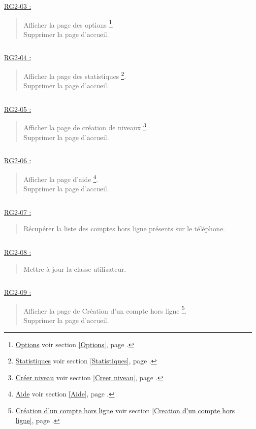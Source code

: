 \documentclass{report}
\begin{document}
		$\,$
		
		\underline{RG2-03 :}
			\begin{quote}
				Afficher la page des options%
					\footnote{
						\hyperlink{Options}{Options}
						\og voir section \ref{Options}, page \pageref{Options}.\fg
					}.\\
				Supprimer la page d'accueil\footnotemark[2].
			\end{quote}


		$\,$

		\underline{RG2-04 :}
			\begin{quote}
				Afficher la page des statistiques%
					\footnote{
						\hyperlink{Statistiques}{Statistiques}
						\og voir section \ref{Statistiques}, page \pageref{Statistiques}.\fg
					}.\\
				Supprimer la page d'accueil\footnotemark[2].
			\end{quote}

		$\,$

		\underline{RG2-05 :}
			\begin{quote}
				Afficher la page de création de niveaux%
					\footnote{
						\hyperlink{Creer niveau}{Créer niveau}
						\og voir section \ref{Creer niveau}, page \pageref{Creer niveau}.\fg
					}.\\
				Supprimer la page d'accueil\footnotemark[2].		
			\end{quote}

		$\,$

		\underline{RG2-06 :}
			\begin{quote}
				Afficher la page d'aide%
					\footnote{
						\hyperlink{Aide}{Aide}
						\og voir section \ref{Aide}, page \pageref{Aide}.\fg
					}.\\
				Supprimer la page d'accueil\footnotemark[2].		
			\end{quote}
		
		$\,$	
			
		\underline{RG2-07 :}
			\begin{quote}
				Récupérer la liste des comptes hors ligne présents sur le téléphone.\\
			\end{quote}

		$\,$

		\underline{RG2-08 :}
			\begin{quote}
				Mettre à jour la classe utilisateur.
			\end{quote}

		$\,$

		\underline{RG2-09 :}
			\begin{quote}
				Afficher la page de Création d'un compte hors ligne%
					\footnote{
						\hyperlink{profil}{Création d'un compte hors ligne}
						\og voir section \ref{Creation d'un compte hors ligne}, page \pageref{Creation d'un compte hors ligne}.\fg
					}.\\
				Supprimer la page d'accueil\footnotemark[2].
			\end{quote}
\end{document}

